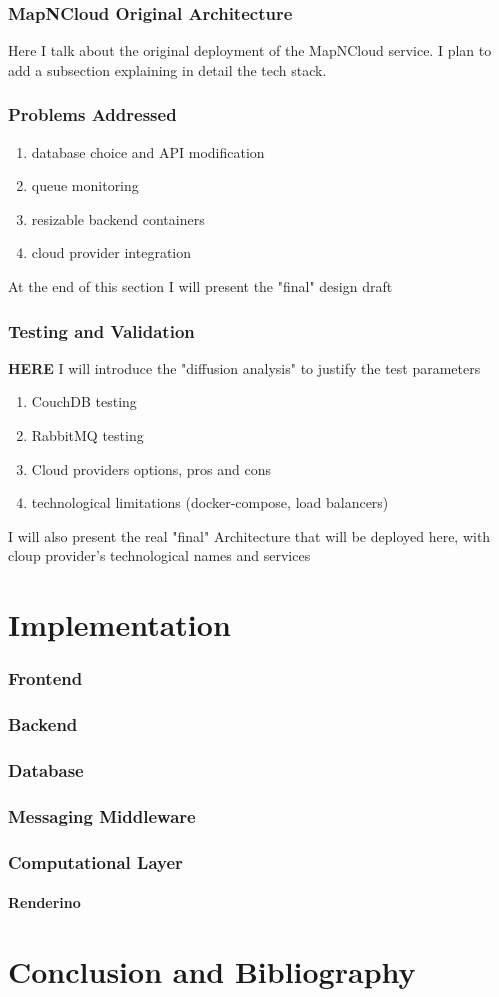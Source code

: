 \documentclass{article}
\begin{document}
		\section{MapNCloud Original Architecture}
			Here I talk about the original deployment of the MapNCloud service. I plan to add a subsection explaining in detail the tech stack.
		\section{Problems Addressed}
			\begin{enumerate}
				\item database choice and API modification
				\item queue monitoring
				\item resizable backend containers
				\item cloud provider integration
			\end{enumerate}
			At the end of this section I will present the "final" design draft
		\section{Testing and Validation}
			\textbf{HERE} I will introduce the "diffusion analysis" to justify the test parameters
			\begin{enumerate}
				\item CouchDB testing
				\item RabbitMQ testing
				\item Cloud providers options, pros and cons
				\item technological limitations (docker-compose, load balancers)
			\end{enumerate}
			I will also present the real "final" Architecture that will be deployed here, with cloup provider's technological names and services
	
	\part{Implementation}
		\section{Frontend}
		\section{Backend}
		\section{Database}
		\section{Messaging Middleware}
		\section{Computational Layer}
			\subsection{Renderino}

	\part{Conclusion and Bibliography}
\end{document}
